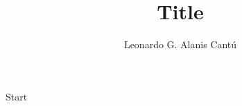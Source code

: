 \documentclass{lgacfancy}
\title{Title}
\author[1]{Leonardo G. Alanis Cantú }
\affil[1]{A00824703}
\begin{document}
\maketitle

Start
\end{document}
